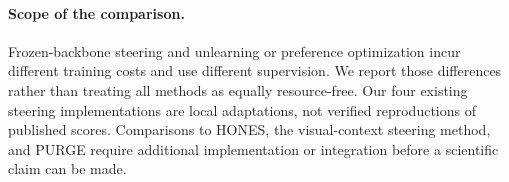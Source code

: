 \paragraph{Scope of the comparison.}
Frozen-backbone steering and unlearning or preference optimization incur
different training costs and use different supervision. We report those
differences rather than treating all methods as equally resource-free.
Our four existing steering implementations are local adaptations, not
verified reproductions of published scores. Comparisons to HONES, the
visual-context steering method, and PURGE require additional implementation
or integration before a scientific claim can be made.
